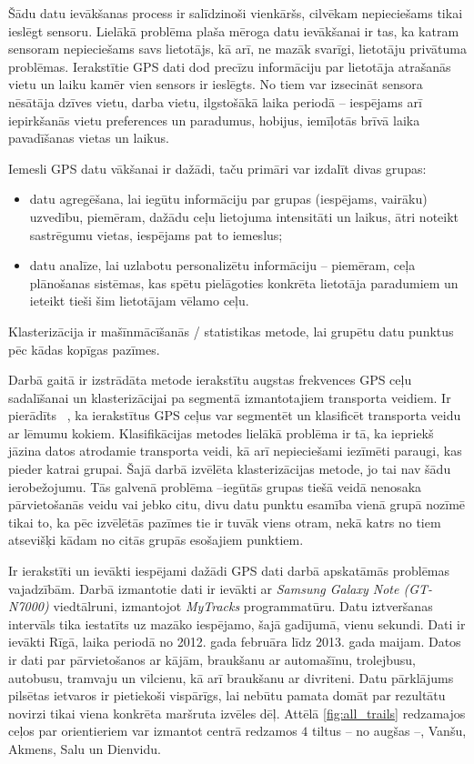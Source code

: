 \documentclass{ludis}
\begin{document}
Šādu datu ievākšanas process ir salīdzinoši vienkāršs, cilvēkam nepieciešams tikai ieslēgt sensoru.
Lielākā problēma plaša mēroga datu ievākšanai ir tas, ka katram sensoram nepie\-ciešams savs 
lietotājs, kā arī, ne mazāk svarīgi, lietotāju privātuma problēmas. Ierakstītie GPS dati dod
precīzu informāciju par lietotāja atrašanās vietu un laiku kamēr vien sensors ir ieslēgts. 
No tiem var izsecināt sensora nēsātāja dzīves vietu, darba vietu, ilgstošākā laika periodā -- 
iespējams arī iepirkšanās vietu preferences un paradumus, hobijus, iemīļotās brīvā laika 
pava\-dīšanas vietas un laikus.

Iemesli GPS datu vākšanai ir dažādi, taču primāri var izdalīt divas grupas:
\begin{itemize}
\item datu agregēšana, lai iegūtu informāciju par grupas (iespējams, vairāku) uzvedību, \linebreak 
  piemēram, dažādu ceļu lietojuma intensitāti un laikus, ātri noteikt sastrēgumu vietas, iespējams 
  pat to iemeslus;
\item datu analīze, lai uzlabotu personalizētu informāciju -- piemēram, ceļa plānošanas sistēmas,
  kas spētu pielāgoties konkrēta lietotāja paradumiem un ieteikt tieši šim lietotājam vēlamo ceļu.
\end{itemize}

Klasterizācija ir mašīnmācīšanās / statistikas metode, lai grupētu datu punktus pēc kādas kopīgas
pazīmes.

Darbā gaitā ir izstrādāta metode ierakstītu augstas frekvences GPS ceļu sadalīšanai un 
klasterizācijai pa segmentā izmantotajiem transporta veidiem. Ir pierādīts 
~\cite{zheng_gps_segmentation}, ka ierakstītus GPS ceļus var segmentēt un klasificēt transporta
veidu ar lēmumu kokiem. Klasifikācijas \linebreak metodes lielākā problēma ir tā, ka iepriekš jāzina 
datos atrodamie transporta veidi, kā arī nepieciešami iezīmēti paraugi, kas pieder katrai grupai.
Šajā darbā izvēlēta klasterizācijas \linebreak metode, jo tai nav šādu ierobežojumu. Tās galvenā
problēma --iegūtās grupas tiešā veidā neno\-saka pārvietošanās veidu vai jebko citu, divu datu punktu 
esamība vienā grupā nozīmē tikai to, ka pēc izvēlētās pazīmes tie ir tuvāk viens otram, nekā katrs 
no tiem atsevišķi kādam no citās grupās esošajiem punktiem.

Ir ierakstīti un ievākti iespējami dažādi GPS dati darbā apskatāmās problēmas vajadzībām. 
Darbā izmantotie dati ir ievākti ar \emph{Samsung Galaxy Note (GT-N7000)} viedtālruni, izmantojot
\emph{MyTracks} programmatūru. Datu iztveršanas intervāls tika iestatīts uz mazāko iespējamo,
šajā gadījumā, vienu sekundi. Dati ir ievākti Rīgā, laika periodā no 2012. gada februāra līdz 
2013. gada maijam. Datos ir dati par pārvietošanos ar kājām, braukšanu ar automašīnu, trolejbusu,
autobusu, tramvaju un vilcienu, kā arī braukšanu ar divriteni. Datu pārklājums pilsētas ietvaros 
ir pietiekoši vispārīgs, lai nebūtu pamata domāt par rezultātu novirzi tikai viena konkrēta 
maršruta izvēles dēļ. Attēlā \ref{fig:all_trails} redzamajos ceļos par orientieriem var izmantot
centrā redzamos $4$ tiltus -- no augšas --, Vanšu, Akmens, Salu un Dienvidu.
\end{document}
